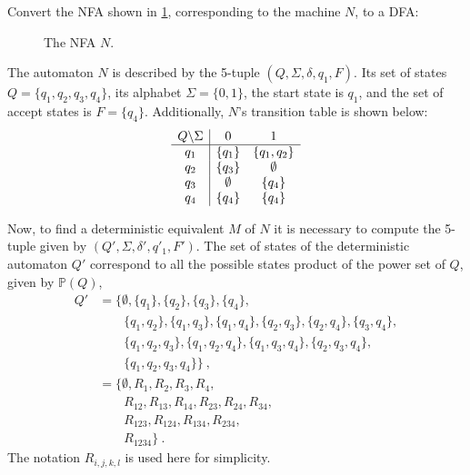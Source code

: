 Convert the NFA shown in \cref{fig:nondet-automaton}, corresponding to the machine $N$, to a DFA:
\begin{figure}[ht!]
    \centering
    
    \caption{The NFA $N$.}
    \label{fig:nondet-automaton}
\end{figure}
\begin{solution}
    The automaton $N$ is described by the 5-tuple $\left(Q, \Sigma, \delta, q_1, F\right)$. Its set of states $Q = \{q_1, q_2, q_3, q_4\}$, its alphabet $\Sigma = \{0, 1\}$, the start state is $q_1$, and the set of accept states is $F = \{q_4\}$. Additionally, $N$'s transition table is shown below:
    \begin{equation*}
        \begin{array}{c | c c}
            Q \backslash \Sigma & 0 & 1 \\
            \hline
            q_1 & \{q_1\} & \{q_1, q_2\} \\
            q_2 & \{q_3\} & \emptyset \\
            q_3 & \emptyset & \{q_4\} \\
            q_4 & \{q_4\} & \{q_4\}
        \end{array}
    \end{equation*}

    Now, to find a deterministic equivalent $M$ of $N$ it is necessary to compute the 5-tuple given by $(Q', \Sigma, \delta', q'_{1}, F')$. The set of states of the deterministic automaton $Q'$ correspond to all the possible states product of the power set of $Q$, given by $\mathbb{P}(Q)$,
    \begin{equation*}
        \begin{split}
            Q' & = \{\emptyset, \{q_1\}, \{q_2\}, \{q_3\}, \{q_4\}, \\
            & \qquad \{q_1, q_2\}, \{q_1, q_3\}, \{q_1, q_4\}, \{q_2, q_3\}, \{q_2, q_4\}, \{q_3, q_4\}, \\
            & \qquad \{q_1, q_2, q_3\}, \{q_1, q_2, q_4\}, \{q_1, q_3, q_4\}, \{q_2, q_3, q_4\}, \\ 
            & \qquad \{q_1, q_2, q_3, q_4\}\}\ ,\\
            & = \{\emptyset, R_{1}, R_{2}, R_{3}, R_{4}, \\
            & \qquad R_{12}, R_{13}, R_{14}, R_{23}, R_{24}, R_{34}, \\
            & \qquad R_{123}, R_{124}, R_{134}, R_{234}, \\
            & \qquad R_{1234}\}\ .
        \end{split}
    \end{equation*}
    The notation $R_{i,j,k,l}$ is used here for simplicity.


\end{solution}
